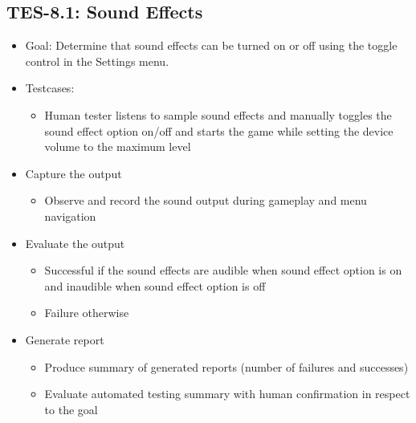 \subsection{TES-8.1: Sound Effects}
\begin{itemize}
\item Goal: Determine that sound effects can be turned on or off using the 
toggle control in the Settings menu.

\item Testcases: 
\begin{itemize}
\item Human tester listens to sample sound effects and manually toggles the sound effect option on/off and starts the game while setting the device volume to the maximum level
\end{itemize}

\item Capture the output 
\begin{itemize}
\item Observe and record the sound output during gameplay and menu navigation
\end{itemize}

\item Evaluate the output 
\begin{itemize}
\item Successful if the sound effects are audible when sound effect option is on and inaudible when sound effect option is off
\item Failure otherwise
\end{itemize}

\item Generate report 
\begin{itemize}
\item Produce summary of generated reports (number of failures and successes)
\item Evaluate automated testing summary with human confirmation in respect to the goal
\end{itemize}
\end{itemize}

